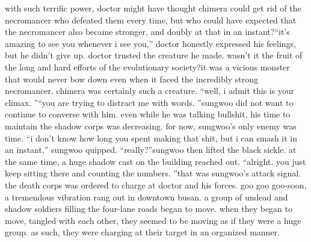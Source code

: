  with such terrific power, doctor might have thought chimera could get rid of the necromancer who defeated them every time, but who could have expected that the necromancer also became stronger, and doubly at that in an instant?“it’s amazing to see you whenever i see you,” doctor honestly expressed his feelings, but he didn’t give up.
doctor trusted the creature he made.
 wasn’t it the fruit of the long and hard efforts of the evolutionary society?it was a vicious monster that would never bow down even when it faced the incredibly strong necromancer.
 chimera was certainly such a creature.
“well, i admit this is your climax.
”“you are trying to distract me with words.
”sungwoo did not want to continue to converse with him.
 even while he was talking bullshit, his time to maintain the shadow corps was decreasing.
 for now, sungwoo’s only enemy was time.
“i don’t know how long you spent making that shit, but i can smash it in an instant,” sungwoo quipped.
“really?”sungwoo then lifted the black sickle.
 at the same time, a huge shadow cast on the building reached out.
“alright.
 you just keep sitting there and counting the numbers.
”that was sungwoo’s attack signal.
 the death corps was ordered to charge at doctor and his forces.
goo goo goo-soon, a tremendous vibration rang out in downtown busan.
 a group of undead and shadow soldiers filling the four-lane roads began to move.
when they began to move, tangled with each other, they seemed to be moving as if they were a huge group.
 as such, they were charging at their target in an organized manner.


